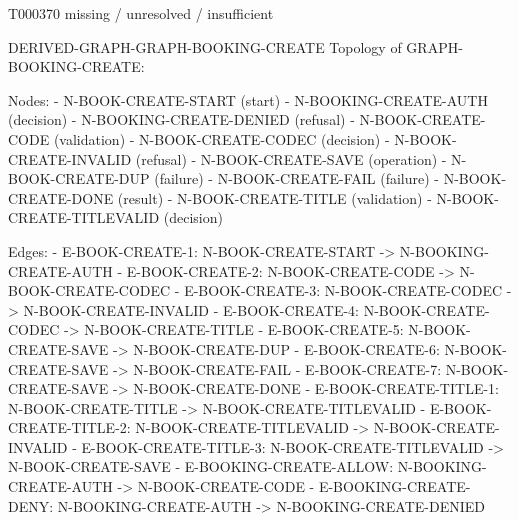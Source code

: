 \documentclass[11pt,a4paper]{article}
\begin{document}
\begin{atlastext}{T000370}
missing / unresolved / insufficient
\end{atlastext}
\par\noindent\begin{minipage}{\linewidth}
\begin{atlasderived}{DERIVED-GRAPH-GRAPH-BOOKING-CREATE}
Topology of GRAPH-BOOKING-CREATE:

Nodes:
- N-BOOK-CREATE-START (start)
- N-BOOKING-CREATE-AUTH (decision)
- N-BOOKING-CREATE-DENIED (refusal)
- N-BOOK-CREATE-CODE (validation)
- N-BOOK-CREATE-CODEC (decision)
- N-BOOK-CREATE-INVALID (refusal)
- N-BOOK-CREATE-SAVE (operation)
- N-BOOK-CREATE-DUP (failure)
- N-BOOK-CREATE-FAIL (failure)
- N-BOOK-CREATE-DONE (result)
- N-BOOK-CREATE-TITLE (validation)
- N-BOOK-CREATE-TITLEVALID (decision)

Edges:
- E-BOOK-CREATE-1: N-BOOK-CREATE-START -> N-BOOKING-CREATE-AUTH
- E-BOOK-CREATE-2: N-BOOK-CREATE-CODE -> N-BOOK-CREATE-CODEC
- E-BOOK-CREATE-3: N-BOOK-CREATE-CODEC -> N-BOOK-CREATE-INVALID
- E-BOOK-CREATE-4: N-BOOK-CREATE-CODEC -> N-BOOK-CREATE-TITLE
- E-BOOK-CREATE-5: N-BOOK-CREATE-SAVE -> N-BOOK-CREATE-DUP
- E-BOOK-CREATE-6: N-BOOK-CREATE-SAVE -> N-BOOK-CREATE-FAIL
- E-BOOK-CREATE-7: N-BOOK-CREATE-SAVE -> N-BOOK-CREATE-DONE
- E-BOOK-CREATE-TITLE-1: N-BOOK-CREATE-TITLE -> N-BOOK-CREATE-TITLEVALID
- E-BOOK-CREATE-TITLE-2: N-BOOK-CREATE-TITLEVALID -> N-BOOK-CREATE-INVALID
- E-BOOK-CREATE-TITLE-3: N-BOOK-CREATE-TITLEVALID -> N-BOOK-CREATE-SAVE
- E-BOOKING-CREATE-ALLOW: N-BOOKING-CREATE-AUTH -> N-BOOK-CREATE-CODE
- E-BOOKING-CREATE-DENY: N-BOOKING-CREATE-AUTH -> N-BOOKING-CREATE-DENIED
\end{atlasderived}
\end{minipage}\par
\clearpage
{}\par
{}\par
\end{document}
